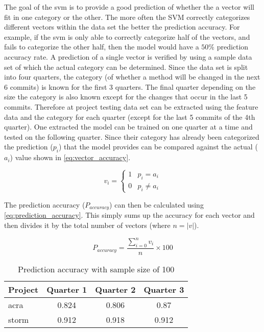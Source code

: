The goal of the \gls{svm} is to provide a good prediction of whether the a vector will fit in one category or the other. The more often the SVM correctly categorizes different vectors within the data set the better the prediction accuracy. For example, if the \gls{svm} is only able to correctly categorize half of the vectors, and fails to categorize the other half, then the model would have a $50\%$ prediction accuracy rate. A prediction of a single vector is verified by using a sample data set of which the actual category can be determined. Since the data set is split into four quarters, the category (of whether a method will be changed in the next 6 commits) is known for the first 3 quarters. The final quarter depending on the size the category is also known except for the changes that occur in the last 5 commits. Therefore at project testing data set can be extracted using the feature data and the category for each quarter (except for the last 5 commits of the 4th quarter). One extracted the model can be trained on one quarter at a time and tested on the following quarter. Since their category has already been categorized the prediction ($p_i$) that the model provides can be compared against the actual ($a_i$) value shown in \ref{eq:vector_accuracy}.


\begin{equation} 
\label{eq:vector_accuracy}
v_i = \left\{\begin{matrix}
1 & p_i = a_i\\ 
0 & p_i \ne a_i
\end{matrix}\right.
\end{equation}

The prediction accuracy ($P_{accuracy}$) can then be calculated using \ref{eq:prediction_accuracy}. This simply sums up the accuracy for each vector and then divides it by the total number of vectors (where $n = |v|$).

\begin{equation}
\label{eq:prediction_accuracy}
P_{accuracy} = \frac{\sum_{i=0}^{n}v_i}{n} \times 100
\end{equation}

\begin{table}
\begin{center}

    \begin{tabular}{|l|c|c|c|}
        \hline
        Project & Quarter 1 & Quarter 2 & Quarter 3 \\ \hline
        acra & 0.824 & 0.806 & 0.87   \\ \hline
        storm & 0.912 & 0.918 & 0.912 \\ \hline
    \end{tabular}
    \caption{Prediction accuracy with sample size of 100}
    \label{tab:test_signature_change_freq_100}
\end{center}

\end{table}


